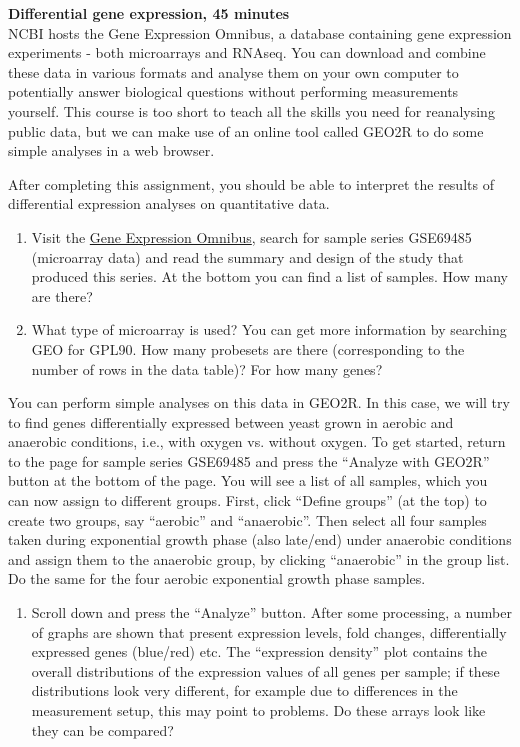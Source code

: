 \begin{framed}
\textbf{Differential gene expression, 45 minutes}\\
NCBI hosts the Gene Expression Omnibus, a database containing gene expression experiments - both microarrays and RNAseq. You can download and combine these data in various formats and analyse them on your own computer to potentially answer biological questions without performing measurements yourself. This course is too short to teach all the skills you need for reanalysing public data, but we can make use of an online tool called GEO2R to do some simple analyses in a web browser.

After completing this assignment, you should be able to interpret the results of differential expression analyses on quantitative data.

\begin{enumerate}
\item Visit the \href{https://www.ncbi.nlm.nih.gov/geo}{Gene Expression Omnibus}, search for sample series GSE69485 (microarray data) and read the summary and design of the study that produced this series. At the bottom you can find a list of samples. How many are there?
\item What type of microarray is used? You can get more information by searching GEO for GPL90. How many probesets are there (corresponding to the number of rows in the data table)? For how many genes?
\end{enumerate}

You can perform simple analyses on this data in GEO2R.
In this case, we will try to find genes differentially expressed between yeast grown in aerobic and anaerobic conditions, i.e., with oxygen vs. without oxygen.
To get started, return to the page for sample series GSE69485 and press the ``Analyze with GEO2R'' button at the bottom of the page.
You will see a list of all samples, which you can now assign to different groups.
First, click ``Define groups'' (at the top) to create two groups, say ``aerobic'' and ``anaerobic''.
Then select all four samples taken during exponential growth phase (also late/end) under anaerobic conditions and assign them to the anaerobic group, by clicking ``anaerobic'' in the group list.
Do the same for the four aerobic exponential growth phase samples.

\begin{enumerate}[resume]
\item Scroll down and press the ``Analyze'' button. After some processing, a number of graphs are shown that present expression levels, fold changes, differentially expressed genes (blue/red) etc. The ``expression density'' plot contains the overall distributions of the expression values of all genes per sample; if these distributions look very different, for example due to differences in the measurement setup, this may point to problems. Do these arrays look like they can be compared?
\end{enumerate}


\end{framed}
